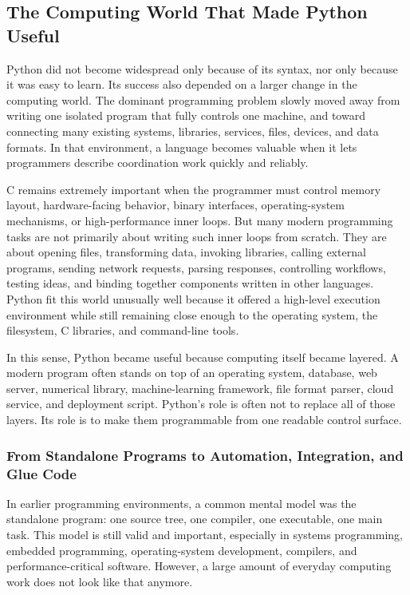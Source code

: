 \subsection{The Computing World That Made Python Useful}

Python did not become widespread only because of its syntax, nor only because it was easy to learn. Its success also depended on a larger change in the computing world. The dominant programming problem slowly moved away from writing one isolated program that fully controls one machine, and toward connecting many existing systems, libraries, services, files, devices, and data formats. In that environment, a language becomes valuable when it lets programmers describe coordination work quickly and reliably.

C remains extremely important when the programmer must control memory layout, hardware-facing behavior, binary interfaces, operating-system mechanisms, or high-performance inner loops. But many modern programming tasks are not primarily about writing such inner loops from scratch. They are about opening files, transforming data, invoking libraries, calling external programs, sending network requests, parsing responses, controlling workflows, testing ideas, and binding together components written in other languages. Python fit this world unusually well because it offered a high-level execution environment while still remaining close enough to the operating system, the filesystem, C libraries, and command-line tools.

In this sense, Python became useful because computing itself became layered. A modern program often stands on top of an operating system, database, web server, numerical library, machine-learning framework, file format parser, cloud service, and deployment script. Python's role is often not to replace all of those layers. Its role is to make them programmable from one readable control surface.

\subsubsection{From Standalone Programs to Automation, Integration, and Glue Code}

In earlier programming environments, a common mental model was the standalone program: one source tree, one compiler, one executable, one main task. This model is still valid and important, especially in systems programming, embedded programming, operating-system development, compilers, and performance-critical software. However, a large amount of everyday computing work does not look like that anymore.


